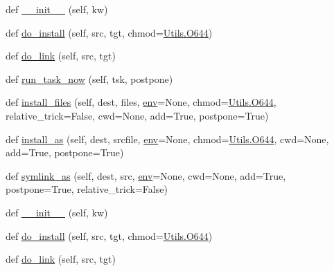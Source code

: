 \begin{DoxyCompactItemize}
\item 
def \hyperlink{classwaflib_1_1_build_1_1_install_context_a92d1f07459687e8da5a0e871eeb462f0}{\+\_\+\+\_\+init\+\_\+\+\_\+} (self, kw)
\item 
def \hyperlink{classwaflib_1_1_build_1_1_install_context_a389ce541ae521e6e4e616cfddf89bd7e}{do\+\_\+install} (self, src, tgt, chmod=\hyperlink{namespacewaflib_1_1_utils_ade9dd27fadbf52a0641bbff06d3dd3ac}{Utils.\+O644})
\item 
def \hyperlink{classwaflib_1_1_build_1_1_install_context_ac012afc7dd8fb657141d28ad571392f4}{do\+\_\+link} (self, src, tgt)
\item 
def \hyperlink{classwaflib_1_1_build_1_1_install_context_ab9691686f803c54151ec5bbc92717a0f}{run\+\_\+task\+\_\+now} (self, tsk, postpone)
\item 
def \hyperlink{classwaflib_1_1_build_1_1_install_context_af07f1f67998c0f4a6d20361cd28ee0bc}{install\+\_\+files} (self, dest, files, \hyperlink{classwaflib_1_1_build_1_1_build_context_ac3b464a969bc6c898c739b6d820b2219}{env}=None, chmod=\hyperlink{namespacewaflib_1_1_utils_ade9dd27fadbf52a0641bbff06d3dd3ac}{Utils.\+O644}, relative\+\_\+trick=False, cwd=None, add=True, postpone=True)
\item 
def \hyperlink{classwaflib_1_1_build_1_1_install_context_a7a653c97bec879bfd813d525c8c0caf3}{install\+\_\+as} (self, dest, srcfile, \hyperlink{classwaflib_1_1_build_1_1_build_context_ac3b464a969bc6c898c739b6d820b2219}{env}=None, chmod=\hyperlink{namespacewaflib_1_1_utils_ade9dd27fadbf52a0641bbff06d3dd3ac}{Utils.\+O644}, cwd=None, add=True, postpone=True)
\item 
def \hyperlink{classwaflib_1_1_build_1_1_install_context_a25a3977cdde84cb8b06ce8316acc686b}{symlink\+\_\+as} (self, dest, src, \hyperlink{classwaflib_1_1_build_1_1_build_context_ac3b464a969bc6c898c739b6d820b2219}{env}=None, cwd=None, add=True, postpone=True, relative\+\_\+trick=False)
\item 
def \hyperlink{classwaflib_1_1_build_1_1_install_context_a92d1f07459687e8da5a0e871eeb462f0}{\+\_\+\+\_\+init\+\_\+\+\_\+} (self, kw)
\item 
def \hyperlink{classwaflib_1_1_build_1_1_install_context_a389ce541ae521e6e4e616cfddf89bd7e}{do\+\_\+install} (self, src, tgt, chmod=\hyperlink{namespacewaflib_1_1_utils_ade9dd27fadbf52a0641bbff06d3dd3ac}{Utils.\+O644})
\item 
def \hyperlink{classwaflib_1_1_build_1_1_install_context_ac012afc7dd8fb657141d28ad571392f4}{do\+\_\+link} (self, src, tgt)
\item 

\end{DoxyCompactItemize}
